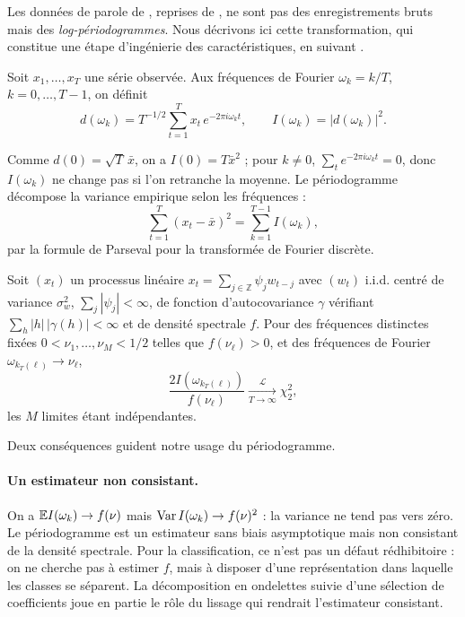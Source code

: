 Les données de parole de \citet{berlinet2008functional}, reprises de \citet{hastie1995penalized}, ne sont pas des enregistrements bruts mais des \emph{log-périodogrammes}. Nous décrivons ici cette transformation, qui constitue une étape d'ingénierie des caractéristiques, en suivant \citet[section 4.3]{shumway2011time}.

\begin{definition}
Soit $x_1,\dots,x_T$ une série observée. Aux fréquences de Fourier $\omega_k=k/T$, $k=0,\dots,T-1$, on définit
\[
  d(\omega_k)=T^{-1/2}\sum_{t=1}^{T}x_t\,e^{-2\pi i\omega_kt},
  \qquad
  I(\omega_k)=|d(\omega_k)|^2 .
\]
\end{definition}

Comme $d(0)=\sqrt T\,\bar x$, on a $I(0)=T\bar x^2$ ; pour $k\ne0$, $\sum_te^{-2\pi i\omega_kt}=0$, donc $I(\omega_k)$ ne change pas si l'on retranche la moyenne. Le périodogramme décompose la variance empirique selon les fréquences :
\[
  \sum_{t=1}^T(x_t-\bar x)^2=\sum_{k=1}^{T-1}I(\omega_k),
\]
par la formule de Parseval pour la transformée de Fourier discrète.

\begin{proposition}\label{prop-periodogramme}
Soit $(x_t)$ un processus linéaire $x_t=\sum_{j\in\mathbb Z}\psi_jw_{t-j}$ avec $(w_t)$ i.i.d. centré de variance $\sigma_w^2$, $\sum_j|\psi_j|<\infty$, de fonction d'autocovariance $\gamma$ vérifiant $\sum_h|h|\,|\gamma(h)|<\infty$ et de densité spectrale $f$. Pour des fréquences distinctes fixées $0<\nu_1,\dots,\nu_M<1/2$ telles que $f(\nu_\ell)>0$, et des fréquences de Fourier $\omega_{k_T(\ell)}\to\nu_\ell$,
\[
  \frac{2I(\omega_{k_T(\ell)})}{f(\nu_\ell)}\xrightarrow[T\to\infty]{\mathcal L}\chi^2_2,
\]
les $M$ limites étant indépendantes.
\end{proposition}

Deux conséquences guident notre usage du périodogramme.

\paragraph{Un estimateur non consistant.} On a $\mathbb{E} I(\omega_k)\to f(\nu)$ mais $\operatorname{Var} I(\omega_k)\to f(\nu)^2$ : la variance ne tend pas vers zéro. Le périodogramme est un estimateur sans biais asymptotique mais non consistant de la densité spectrale. Pour la classification, ce n'est pas un défaut rédhibitoire : on ne cherche pas à estimer $f$, mais à disposer d'une représentation dans laquelle les classes se séparent. La décomposition en ondelettes suivie d'une sélection de coefficients joue en partie le rôle du lissage qui rendrait l'estimateur consistant.

